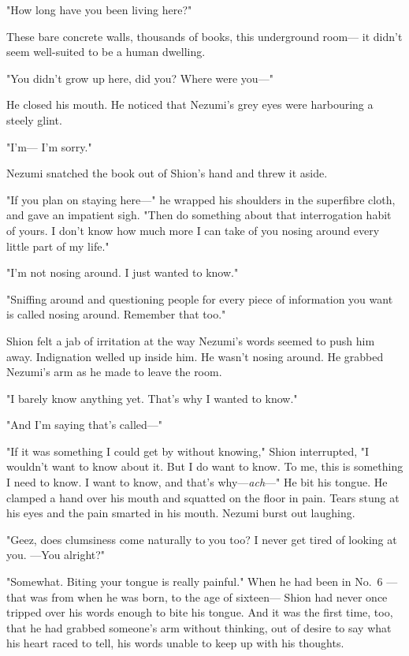 "How long have you been living here?"

These bare concrete walls, thousands of books, this underground room--- it
didn't seem well-suited to be a human dwelling.

"You didn't grow up here, did you? Where were you---"

He closed his mouth. He noticed that Nezumi's grey eyes were harbouring
a steely glint.

"I'm--- I'm sorry."

Nezumi snatched the book out of Shion's hand and threw it aside.

"If you plan on staying here---" he wrapped his shoulders in the
superfibre cloth, and gave an impatient sigh. "Then do something about
that interrogation habit of yours. I don't know how much more I can take
of you nosing around every little part of my life."

"I'm not nosing around. I just wanted to know."

"Sniffing around and questioning people for every piece of information
you want is called nosing around. Remember that too."

Shion felt a jab of irritation at the way Nezumi's words seemed to push
him away. Indignation welled up inside him. He wasn't nosing around. He
grabbed Nezumi's arm as he made to leave the room.

"I barely know anything yet. That's why I wanted to know."

"And I'm saying that's called---"

"If it was something I could get by without knowing," Shion interrupted,
"I wouldn't want to know about it. But I do want to know. To me, this is
something I need to know. I want to know, and that's why---\emph{ach}---" He bit
his tongue. He clamped a hand over his mouth and squatted on the floor
in pain. Tears stung at his eyes and the pain smarted in his mouth.
Nezumi burst out laughing.

"Geez, does clumsiness come naturally to you too? I never get tired of
looking at you. ---You alright?"

"Somewhat. Biting your tongue is really painful." When he had been in
No.~6 --- that was from when he was born, to the age of sixteen--- Shion had
never once tripped over his words enough to bite his tongue. And it was
the first time, too, that he had grabbed someone's arm without thinking,
out of desire to say what his heart raced to tell, his words unable to
keep up with his thoughts.

